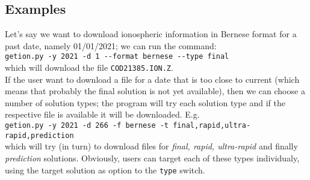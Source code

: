 \subsection{Examples}
\label{ssec:programs-getion}
Let's say we want to download ionospheric information in Bernese format for a past date, 
namely 01/01/2021; we can run the command:\\
\verb|getion.py -y 2021 -d 1 --format bernese --type final|\\
which will download the file \verb|COD21385.ION.Z|.
\\

If the user want to download a file for a date that is too close to current (which 
means that probably the final solution is not yet available), then we can choose a 
number of solution types; the program will try each solution type and if the respective 
file is available it will be downloaded. E.g.\\
\verb|getion.py -y 2021 -d 266 -f bernese -t final,rapid,ultra-rapid,prediction|\\
which will try (in turn) to download files for \emph{final, rapid, ultra-rapid} and 
finally \emph{prediction} solutions. Obviously, users can target each of these types individualy, 
using the target solution as option to the \verb|type| switch.